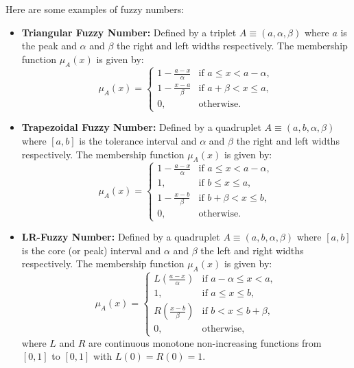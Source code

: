 \begin{example}Here are some examples of fuzzy numbers:
    \begin{itemize}
        \item \textbf{Triangular Fuzzy Number:} Defined by a triplet $A\equiv(a, \alpha, \beta)$ where $a$ is the peak and $\alpha$ and $\beta$ the right and left widths respectively. The membership function $\mu_A(x)$ is given by:
        \[
        \mu_A(x) = 
        \begin{cases} 
        1-\frac{a-x}{\alpha} & \text{if } a \leq x < a-\alpha, \\
        1-\frac{x-a}{\beta} & \text{if } a+\beta < x \leq a, \\
        0, & \text{otherwise.}
        \end{cases}
        \]
        
        \item \textbf{Trapezoidal Fuzzy Number:} Defined by a quadruplet $A\equiv(a, b, \alpha, \beta)$ where $[a,b]$ is the tolerance interval and $\alpha$ and $\beta$ the right and left widths respectively. The membership function $\mu_A(x)$ is given by:
        \[
        \mu_A(x) = 
        \begin{cases} 
        1-\frac{a-x}{\alpha} & \text{if } a \leq x < a-\alpha, \\
        1, & \text{if } b \leq x \leq a, \\
        1-\frac{x-b}{\beta} & \text{if } b+\beta < x \leq b, \\
        0, & \text{otherwise.}
        \end{cases}
        \]
        
        \item \textbf{LR-Fuzzy Number:} Defined by a quadruplet $A\equiv(a, b, \alpha, \beta)$ where $[a,b]$ is the core (or peak) interval and $\alpha$ and $\beta$ the left and right widths respectively. The membership function $\mu_A(x)$ is given by:
        \[
        \mu_A(x) = 
        \begin{cases} 
        L\left(\frac{a-x}{\alpha}\right) & \text{if } a-\alpha \leq x < a, \\
        1, & \text{if } a \leq x \leq b, \\
        R\left(\frac{x-b}{\beta}\right) & \text{if } b < x \leq b+\beta, \\
        0, & \text{otherwise,}
        \end{cases}
        \]
        where $L$ and $R$ are continuous monotone non-increasing functions from $[0,1]$ to $[0,1]$ with $L(0)=R(0)=1$.
    \end{itemize}
\end{example}
    

